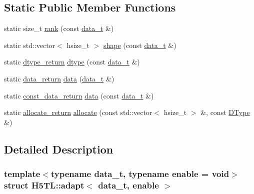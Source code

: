 \subsection*{Static Public Member Functions}
\begin{DoxyCompactItemize}
\item 
static size\-\_\-t \hyperlink{struct_h5_t_l_1_1adapt_ab0ba382db860ddac989aca8bf97c53c3}{rank} (const \hyperlink{struct_h5_t_l_1_1adapt_a6c6e6e0f27f796ef1a3736c48241b0f4}{data\-\_\-t} \&)
\item 
static std\-::vector$<$ hsize\-\_\-t $>$ \hyperlink{struct_h5_t_l_1_1adapt_a4ebb026acfc856ba78c7668b1ec19f76}{shape} (const \hyperlink{struct_h5_t_l_1_1adapt_a6c6e6e0f27f796ef1a3736c48241b0f4}{data\-\_\-t} \&)
\item 
static \hyperlink{struct_h5_t_l_1_1adapt_a7f65229bd91a684cccf110fd225f8fb1}{dtype\-\_\-return} \hyperlink{struct_h5_t_l_1_1adapt_a89a6f377c797f146277f2617ea540872}{dtype} (const \hyperlink{struct_h5_t_l_1_1adapt_a6c6e6e0f27f796ef1a3736c48241b0f4}{data\-\_\-t} \&)
\item 
static \hyperlink{struct_h5_t_l_1_1adapt_a2899b8de59577b8c62a32c66e14a0243}{data\-\_\-return} \hyperlink{struct_h5_t_l_1_1adapt_a9564c77f9eeb31bf74b16c5683cc3c9f}{data} (\hyperlink{struct_h5_t_l_1_1adapt_a6c6e6e0f27f796ef1a3736c48241b0f4}{data\-\_\-t} \&)
\item 
static \hyperlink{struct_h5_t_l_1_1adapt_a144eb8e2bcf76c4e10090c55ef208b2b}{const\-\_\-data\-\_\-return} \hyperlink{struct_h5_t_l_1_1adapt_a3cba0c00aa484c093f070f0a50f5b144}{data} (const \hyperlink{struct_h5_t_l_1_1adapt_a6c6e6e0f27f796ef1a3736c48241b0f4}{data\-\_\-t} \&)
\item 
static \hyperlink{struct_h5_t_l_1_1adapt_afc28c20e3ef90736e37e24cc8686fee6}{allocate\-\_\-return} \hyperlink{struct_h5_t_l_1_1adapt_a1f4c4a1156e094d784bcd85e6171cfc1}{allocate} (const std\-::vector$<$ hsize\-\_\-t $>$ \&, const \hyperlink{class_h5_t_l_1_1_d_type}{D\-Type} \&)
\end{DoxyCompactItemize}


\subsection{Detailed Description}
\subsubsection*{template$<$typename data\-\_\-t, typename enable = void$>$struct H5\-T\-L\-::adapt$<$ data\-\_\-t, enable $>$}



